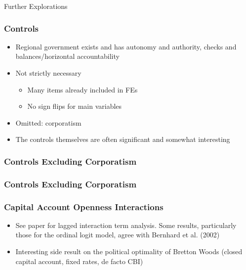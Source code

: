 \documentclass{beamer}
\begin{document}
    \begin{frame}
        \centering Further Explorations
    \end{frame}

    \begin{frame}
        \frametitle{Controls}
        \begin{itemize}
            \item Regional government exists and has autonomy and authority, checks and balances/horizontal accountability
            \item Not strictly necessary
                \begin{itemize}
                    \item Many items already included in FEs
                    \item No sign flips for main variables
                \end{itemize}
            \item Omitted: corporatism
            \item The controls themselves are often significant and somewhat interesting
        \end{itemize}
    \end{frame}

    \begin{frame}
        \frametitle{Controls Excluding Corporatism}
        {
            \let\oldcentering\centering
            \renewcommand\centering{\tiny\oldcentering}
            
        }
    \end{frame}

    \begin{frame}
        \frametitle{Controls Excluding Corporatism}
        {
            \let\oldcentering\centering
            \renewcommand\centering{\tiny\oldcentering}
            
        }
    \end{frame}

    \begin{frame}
        \frametitle{Capital Account Openness Interactions}
        \begin{itemize}
            \item See paper for lagged interaction term analysis. Some results, particularly those for the ordinal logit model, agree with Bernhard et al. (2002)
            \item Interesting side result on the political optimality of Bretton Woods (closed capital account, fixed rates, de facto CBI)
        \end{itemize}
    \end{frame}
\end{document}
